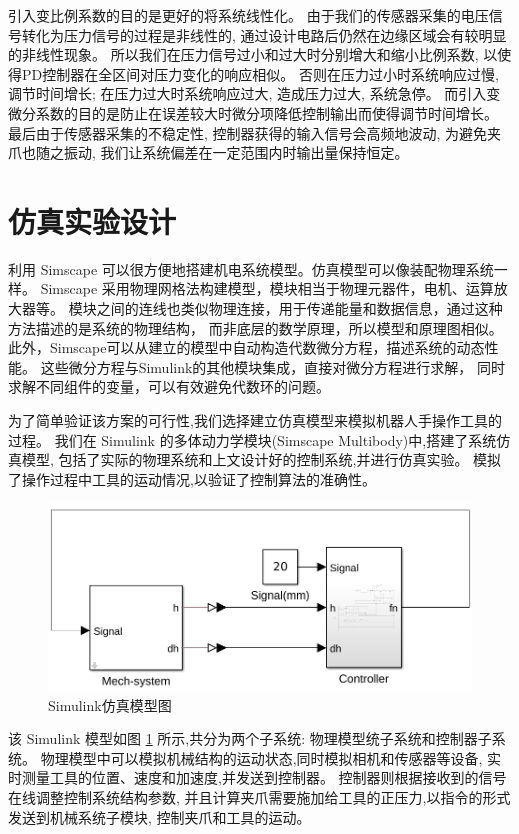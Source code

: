引入变比例系数的目的是更好的将系统线性化。
由于我们的传感器采集的电压信号转化为压力信号的过程是非线性的,
通过设计电路后仍然在边缘区域会有较明显的非线性现象。
所以我们在压力信号过小和过大时分别增大和缩小比例系数,
以使得PD控制器在全区间对压力变化的响应相似。
否则在压力过小时系统响应过慢, 调节时间增长;
在压力过大时系统响应过大, 造成压力过大, 系统急停。
而引入变微分系数的目的是防止在误差较大时微分项降低控制输出而使得调节时间增长。
最后由于传感器采集的不稳定性, 控制器获得的输入信号会高频地波动, 为避免夹爪也随之振动,
我们让系统偏差在一定范围内时输出量保持恒定。

\section{仿真实验设计}
利用 Simscape 可以很方便地搭建机电系统模型。仿真模型可以像装配物理系统一样。
Simscape 采用物理网格法构建模型，模块相当于物理元器件，电机、运算放大器等。
模块之间的连线也类似物理连接，用于传递能量和数据信息，通过这种方法描述的是系统的物理结构，
而非底层的数学原理，所以模型和原理图相似。
此外，Simscape可以从建立的模型中自动构造代数微分方程，描述系统的动态性能。
这些微分方程与Simulink的其他模块集成，直接对微分方程进行求解，
同时求解不同组件的变量，可以有效避免代数环的问题。

为了简单验证该方案的可行性,我们选择建立仿真模型来模拟机器人手操作工具的过程。
我们在 Simulink 的多体动力学模块(Simscape Multibody)中,搭建了系统仿真模型,
包括了实际的物理系统和上文设计好的控制系统,并进行仿真实验。
模拟了操作过程中工具的运动情况,以验证了控制算法的准确性。

\begin{figure}[!ht]
  \centering
  \includegraphics[scale=0.60]{chapter03/pic/3-4}
  \caption{Simulink仿真模型图}
  \label{fig:3-4}
  \vspace{-0.3cm}
\end{figure}

该 Simulink 模型如图 \ref{fig:3-4} 所示,共分为两个子系统:
物理模型统子系统和控制器子系统。
物理模型中可以模拟机械结构的运动状态,同时模拟相机和传感器等设备,
实时测量工具的位置、速度和加速度,并发送到控制器。
控制器则根据接收到的信号在线调整控制系统结构参数,
并且计算夹爪需要施加给工具的正压力,以指令的形式发送到机械系统子模块,
控制夹爪和工具的运动。


